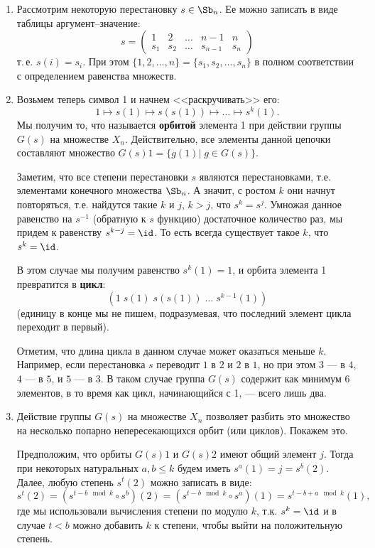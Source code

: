 \begin{enumerate}
\item Рассмотрим некоторую перестановку $s\in \Sb_n$. Ее можно записать в виде таблицы аргумент--значение:
$$
s=
\begin{pmatrix}
1 & 2 & \dots & n-1 & n \\
s_1 & s_2 & \dots & s_{n-1} & s_n
\end{pmatrix}
$$
т.\,е. $s(i)=s_i$. При этом $\{1,2,\dots,n\}=\{s_1,s_2,\dots,s_n\}$ в полном соответствии с определением равенства множеств.

\item Возьмем теперь символ 1 и начнем <<раскручивать>> его:
$$
1\mapsto s(1)\mapsto s(s(1))\mapsto\dots\mapsto s^k(1).
$$
Мы получим то, что называется \textbf{орбитой} элемента 1 при действии группы $G(s)$ на множестве $X_n$. Действительно, все элементы данной цепочки составляют множество $G(s)1=\{g(1)|\;g\in G(s)\}$.

Заметим, что все степени перестановки $s$ являются перестановками, т.е. элементами конечного множества $\Sb_n$. А значит, с ростом $k$ они начнут повторяться, т.е. найдутся такие $k$ и $j$, $k>j$, что $s^k=s^j$. Умножая данное равенство на $s^{-1}$ (обратную к $s$ функцию) достаточное количество раз, мы придем к равенству $s^{k-j}=\id$.
То есть всегда существует такое $k$, что $s^k=\id$.

В этом случае мы получим равенство $s^k(1)=1$, и орбита элемента 1 превратится в \textbf{цикл}:
$$
(1\; s(1)\; s(s(1))\;\dots\; s^{k-1}(1))
$$
(единицу в конце мы не пишем, подразумевая, что последний элемент цикла переходит в первый).

Отметим, что длина цикла в данном случае может оказаться меньше $k$. Например, если перестановка $s$ переводит $1$ в $2$ и $2$ в $1$, но при этом $3$ --- в $4$, $4$ --- в $5$, и $5$ --- в $3$. В таком случае группа $G(s)$ содержит как минимум 6 элементов, в то время как цикл, начинающийся с 1, --- всего лишь два.

\item Действие группы $G(s)$ на множестве $X_n$ позволяет разбить это множество на несколько попарно непересекающихся орбит (или циклов). Покажем это.

Предположим, что орбиты $G(s)1$ и $G(s)2$ имеют общий элемент $j$. Тогда при некоторых натуральных $a,b\le k$ будем иметь $s^a(1)=j=s^b(2)$. Далее, любую степень $s^t(2)$ можно записать в виде:
$$
s^t(2) = (s^{t-b\mod k}\circ s^b)(2) = (s^{t-b\mod k}\circ s^a)(1) = s^{t-b+a\mod k}(1),
$$
где мы использовали вычисления степени по модулю $k$, т.к. $s^k=\id$ и в случае $t<b$ можно добавить $k$ к степени, чтобы выйти на положительную степень.


\end{enumerate}
